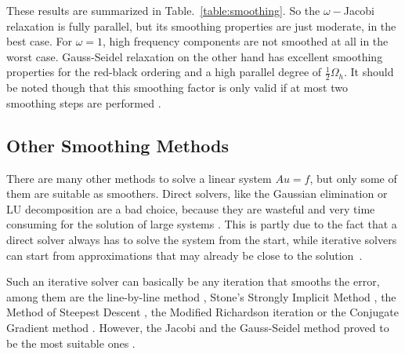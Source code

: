 These results are summarized in Table.~\ref{table:smoothing}. So the $\omega-$Jacobi relaxation is fully parallel, but its smoothing properties are just moderate, in the best case. For $\omega = 1$, high frequency components are not smoothed at all in the worst case. Gauss-Seidel relaxation on the other hand has excellent smoothing properties for the red-black ordering and a high parallel degree of $\frac{1}{2}\Omega_h$. It should be noted though that this smoothing factor is only valid if at most two smoothing steps are performed \cite{Trottenberg:2000:MUL:374106}. 


\subsection{Other Smoothing Methods}
There are many other methods to solve a linear system $Au = f$, but only some of them are suitable as smoothers. Direct solvers, like the Gaussian elimination or LU decomposition are a bad choice, because they are wasteful and very time consuming for the solution of large systems \cite{mazumder2015numerical}. This is partly due to the fact that a direct solver always has to solve the system from the start, while iterative solvers can start from approximations that may already be close to the solution~\cite{ascher2011first}.

Such an iterative solver can basically be any iteration that smooths the error, among them are the line-by-line method \cite{mazumder2015numerical},  Stone's Strongly Implicit Method \cite{stone1968iterative}, the Method of Steepest Descent \cite{mazumder2015numerical}, the Modified Richardson iteration \cite{richardson1911ix} or the Conjugate Gradient method \cite{hestenes1952methods}. However, the Jacobi and the Gauss-Seidel method proved to be the most suitable ones \cite{Trottenberg:2000:MUL:374106}.




